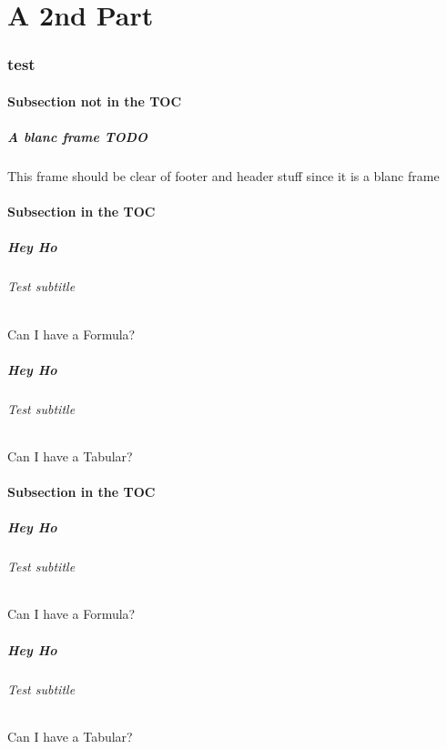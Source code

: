 \documentclass[german,aspectratio=169,titlestyle=white]{tudbeamer}
\begin{document}
\part{A 2nd Part}
\section{test}
\subsection*{Subsection not in the TOC}
\begin{frame}[allowframebreaks]
	\frametitle{A blanc frame TODO}
	This frame should be clear of footer and header stuff since it is a blanc frame
\end{frame}

\subsection{Subsection in the TOC}
\begin{frame}
	\frametitle{Hey Ho}
	\framesubtitle{Test subtitle}
	Can I have a Formula?
\end{frame}
\begin{frame}
	\frametitle{Hey Ho}
	\framesubtitle{Test subtitle}
	Can I have a Tabular?
\end{frame}

\subsection{Subsection in the TOC}
\begin{frame}
	\frametitle{Hey Ho}
	\framesubtitle{Test subtitle}
	Can I have a Formula?
\end{frame}
\begin{frame}
	\frametitle{Hey Ho}
	\framesubtitle{Test subtitle}
	Can I have a Tabular?
\end{frame}
\end{document}
